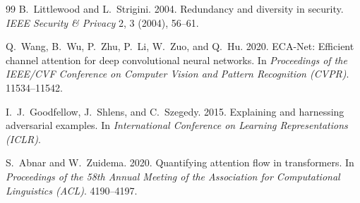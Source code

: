 \documentclass[sigconf]{acmart}
\begin{document}
\begin{thebibliography}{99}
B.\ Littlewood and L.\ Strigini. 2004. Redundancy and diversity in security. \textit{IEEE Security \& Privacy} 2, 3 (2004), 56--61.

Q.\ Wang, B.\ Wu, P.\ Zhu, P.\ Li, W.\ Zuo, and Q.\ Hu. 2020. ECA-Net: Efficient channel attention for deep convolutional neural networks. In \textit{Proceedings of the IEEE/CVF Conference on Computer Vision and Pattern Recognition (CVPR)}. 11534--11542.

I.\ J.\ Goodfellow, J.\ Shlens, and C.\ Szegedy. 2015. Explaining and harnessing adversarial examples. In \textit{International Conference on Learning Representations (ICLR)}.

S.\ Abnar and W.\ Zuidema. 2020. Quantifying attention flow in transformers. In \textit{Proceedings of the 58th Annual Meeting of the Association for Computational Linguistics (ACL)}. 4190--4197.

\end{thebibliography}
\end{document}
